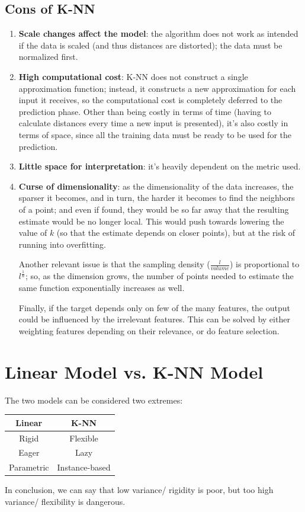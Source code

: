 \subsection{Cons of K-NN}
\begin{enumerate}
    \item \textbf{Scale changes affect the model}: the algorithm does not work as intended if the data is scaled (and thus distances are distorted); the data must be normalized first.

    \item \textbf{High computational cost}: K-NN does not construct a single approximation function; instead, it constructs a new approximation for each input it receives, so the computational cost is completely deferred to the prediction phase. Other than being costly in terms of time (having to calculate distances every time a new input is presented), it's also costly in terms of space, since all the training data must be ready to be used for the prediction.

    \item \textbf{Little space for interpretation}: it's heavily dependent on the metric used.

    \item \textbf{Curse of dimensionality}: as the dimensionality of the data increases, the sparser it becomes, and in turn, the harder it becomes to find the neighbors of a point; and even if found, they would be so far away that the resulting estimate would be no longer local. This would push towards lowering the value of $k$ (so that the estimate depends on closer points), but at the risk of running into overfitting.

    Another relevant issue is that the sampling density ($\frac{l}{volume}$) is proportional to $l^{\frac{1}{n}}$; so, as the dimension grows, the number of points needed to estimate the same function exponentially increases as well.

    Finally, if the target depends only on few of the many features, the output could be influenced by the irrelevant features. This can be solved by either weighting features depending on their relevance, or do feature selection.
\end{enumerate}

\section{Linear Model vs. K-NN Model}

The two models can be considered two extremes:

\begin{table}[h]
    \centering
    \begin{tabular}{c|c}
         Linear & K-NN \\
         \hline
         Rigid & Flexible \\
         Eager & Lazy \\
         Parametric & Instance-based \\
    \end{tabular}
\end{table}

In conclusion, we can say that low variance/ rigidity is poor, but too high variance/ flexibility is dangerous.